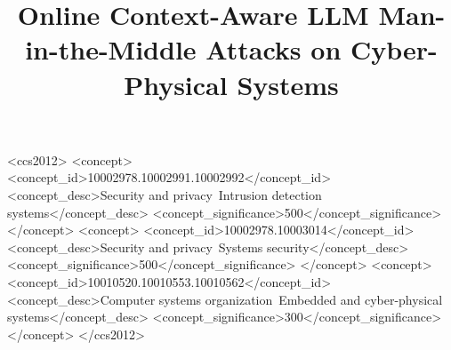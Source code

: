 \documentclass[sigconf,anonymous]{acmart} %
\begin{document}
\title{Online Context-Aware LLM Man-in-the-Middle Attacks on Cyber-Physical Systems}


\renewcommand{\shortauthors}{Anonymous}



\begin{CCSXML}
<ccs2012>
 <concept>
  <concept_id>10002978.10002991.10002992</concept_id>
  <concept_desc>Security and privacy~Intrusion detection systems</concept_desc>
  <concept_significance>500</concept_significance>
 </concept>
 <concept>
  <concept_id>10002978.10003014</concept_id>
  <concept_desc>Security and privacy~Systems security</concept_desc>
  <concept_significance>500</concept_significance>
 </concept>
 <concept>
  <concept_id>10010520.10010553.10010562</concept_id>
  <concept_desc>Computer systems organization~Embedded and cyber-physical systems</concept_desc>
  <concept_significance>300</concept_significance>
 </concept>
</ccs2012>
\end{CCSXML}



\maketitle














\end{document}
